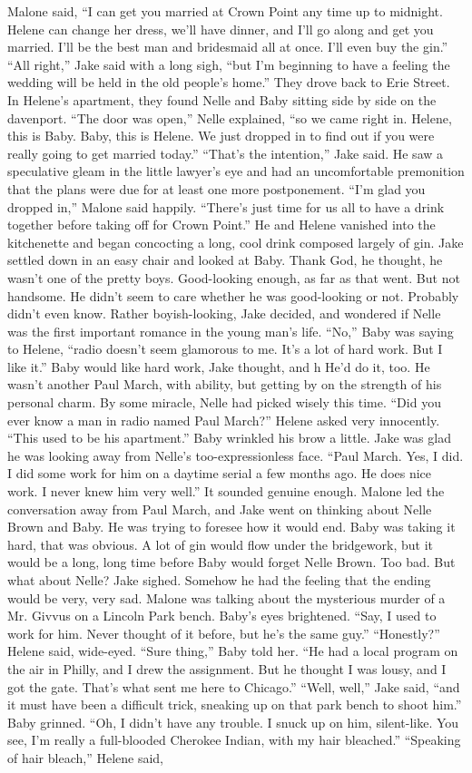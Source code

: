 \documentclass{novel}
\begin{document}
Malone said, “I can get you married at Crown Point any time up to midnight. Helene can change her dress, we’ll have dinner, and I’ll go along and get you married. I’ll be the best man and bridesmaid all at once. I'll even buy the gin.” “All right,” Jake said with a long sigh, “but I’m beginning to have a feeling the wedding will be held in the old people’s home.” They drove back to Erie Street. In Helene’s apartment, they found Nelle and Baby sitting side by side on the davenport. “The door was open,” Nelle explained, “so we came right in. Helene, this is Baby. Baby, this is Helene. We just dropped in to find out if you were really going to get married today.” “That’s the intention,” Jake said. He saw a speculative gleam in the little lawyer’s eye and had an uncomfortable premonition that the plans were due for at least one more postponement. “I’m glad you dropped in,” Malone said happily. “There’s just time for us all to have a drink together before taking off for Crown Point.” He and Helene vanished into the kitchenette and began concocting a long, cool drink composed largely of gin. Jake settled down in an easy chair and looked at Baby. Thank God, he thought, he wasn’t one of the pretty boys. Good-looking enough, as far as that went. But not handsome. He didn’t seem to care whether he was good-looking or not. Probably didn’t even know. Rather boyish-looking, Jake decided, and wondered if Nelle was the first important romance in the young man’s life. “No,” Baby was saying to Helene, “radio doesn’t seem glamorous to me. It’s a lot of hard work. But I like it.” Baby would like hard work, Jake thought, and h He’d do it, too. He wasn’t another Paul March, with ability, but getting by on the strength of his personal charm. By some miracle, Nelle had picked wisely this time. “Did you ever know a man in radio named Paul March?” Helene asked very innocently. “This used to be his apartment.” Baby wrinkled his brow a little. Jake was glad he was looking away from Nelle’s too-expressionless face. “Paul March. Yes, I did. I did some work for him on a daytime serial a few months ago. He does nice work. I never knew him very well.” It sounded genuine enough. Malone led the conversation away from Paul March, and Jake went on thinking about Nelle Brown and Baby. He was trying to foresee how it would end. Baby was taking it hard, that was obvious. A lot of gin would flow under the bridgework, but it would be a long, long time before Baby would forget Nelle Brown. Too bad. But what about Nelle? Jake sighed. Somehow he had the feeling that the ending would be very, very sad. Malone was talking about the mysterious murder of a Mr. Givvus on a Lincoln Park bench. Baby’s eyes brightened. “Say, I used to work for him. Never thought of it before, but he’s the same guy.” “Honestly?” Helene said, wide-eyed. “Sure thing,” Baby told her. “He had a local program on the air in Philly, and I drew the assignment. But he thought I was lousy, and I got the gate. That’s what sent me here to Chicago.” “Well, well,” Jake said, “and it must have been a difficult trick, sneaking up on that park bench to shoot him.” Baby grinned. “Oh, I didn’t have any trouble. I snuck up on him, silent-like. You see, I’m really a full-blooded Cherokee Indian, with my hair bleached.” “Speaking of hair bleach,” Helene said, 
\end{document}

